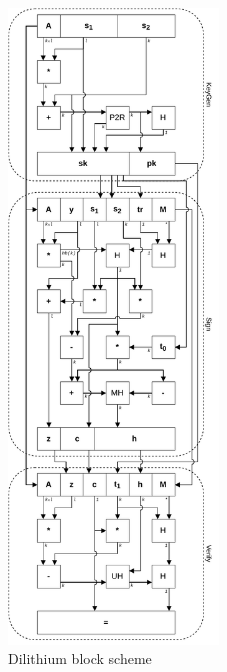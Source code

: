 \begin{figure}[ht!]
  \centering
  \includegraphics[width=0.497\textwidth]{pictures/dil_all.pdf}
  \caption{Dilithium block scheme}
  \label{img:dil_all}
\end{figure}
